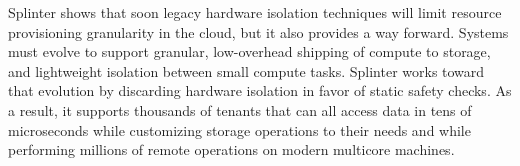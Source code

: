 Splinter shows that soon legacy hardware isolation techniques will
  limit resource provisioning granularity in the cloud, but it also provides a
  way forward.
Systems must evolve to support granular, low-overhead shipping of compute to
    storage, and lightweight isolation between small compute tasks.
Splinter works toward that evolution by discarding hardware isolation in
  favor of static safety checks.
As a result, it supports thousands of tenants that can all access data in tens of
  microseconds while customizing storage operations to their needs and while
  performing millions of remote operations on modern multicore machines.
